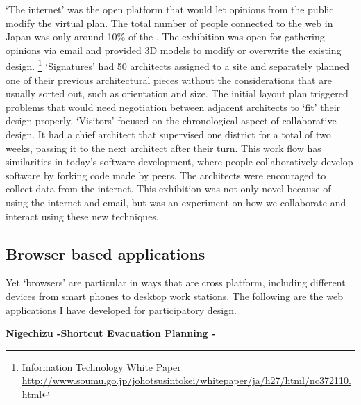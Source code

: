 `The internet' was the open platform that would let opinions from the public modify the virtual plan. The total number of people connected to the web in Japan was only around 10\% of the . The exhibition was open for gathering opinions via email and provided 3D models to modify or overwrite the existing design.
\footnote{Information Technology White Paper
\url{http://www.soumu.go.jp/johotsusintokei/whitepaper/ja/h27/html/nc372110.html}}
`Signatures' had 50 architects assigned to a site and separately planned one of their previous architectural pieces without the considerations that are usually sorted out, such as orientation and size. The initial layout plan triggered problems that would need negotiation between adjacent architects to `fit' their design properly. 
`Visitors' focused on the chronological aspect of collaborative design. It had a chief architect that supervised one district for a total of two weeks, passing it to the next architect after their turn. This work flow has similarities in today's software development, where people collaboratively develop software by forking code made by peers. The architects were encouraged to collect data from the internet. This exhibition was not only novel because of using the internet and email, but was an experiment on how we collaborate and interact using these new techniques.



\subsection{Browser based applications}

 Yet `browsers' are particular in ways that are cross platform, including different devices from smart phones to desktop work stations. The following are the web applications I have developed for participatory design.

\textbf{Nigechizu -Shortcut Evacuation Planning -}

